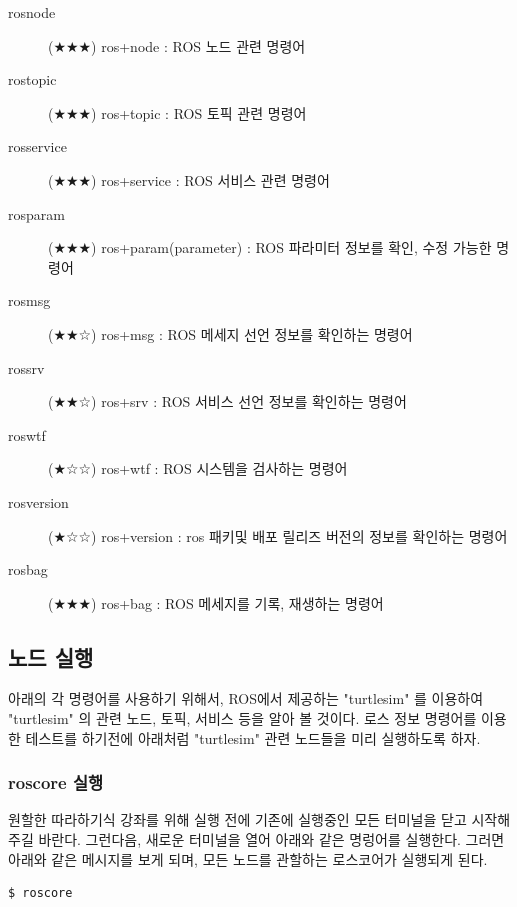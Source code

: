 \vspace{\baselineskip}
\noindent
\begin{description}
\item[rosnode] (★★★) ros+node : ROS 노드 관련 명령어
\item[rostopic] (★★★) ros+topic : ROS 토픽 관련 명령어
\item[rosservice] (★★★) ros+service : ROS 서비스 관련 명령어
\item[rosparam] (★★★) ros+param(parameter) : ROS 파라미터 정보를 확인, 수정 가능한 명령어
\item[rosmsg] (★★☆) ros+msg : ROS 메세지 선언 정보를 확인하는 명령어
\item[rossrv] (★★☆) ros+srv : ROS 서비스 선언 정보를 확인하는 명령어
\item[roswtf] (★☆☆) ros+wtf : ROS 시스템을 검사하는 명령어
\item[rosversion] (★☆☆) ros+version : ros 패키및 배포 릴리즈 버전의 정보를 확인하는 명령어
\item[rosbag] (★★★) ros+bag : ROS 메세지를 기록, 재생하는 명령어
\end{description}

\subsection{노드 실행}

아래의 각 명령어를 사용하기 위해서, ROS에서 제공하는 "turtlesim" 를 이용하여 "turtlesim" 의 관련 노드, 토픽, 서비스 등을 알아 볼 것이다. 로스 정보 명령어를 이용한 테스트를 하기전에 아래처럼 "turtlesim" 관련 노드들을 미리 실행하도록 하자.

\subsubsection{roscore 실행}

원할한 따라하기식 강좌를 위해 실행 전에 기존에 실행중인 모든 터미널을 닫고 시작해 주길 바란다. 그런다음, 새로운 터미널을 열어 아래와 같은 명렁어를 실행한다. 그러면 아래와 같은 메시지를 보게 되며, 모든 노드를 관할하는 로스코어가 실행되게 된다.

\begin{lstlisting}[language=bash]
$ roscore
\end{lstlisting}


